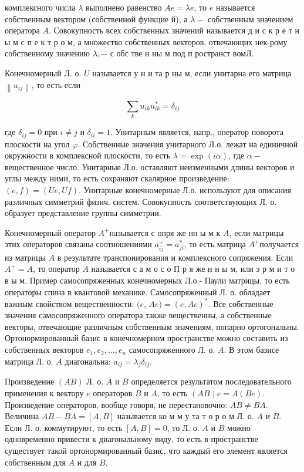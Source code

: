\documentclass[10pt]{article}
\begin{document}
комплексного числа $\lambda$ выполнено равенство $A e=\lambda e$, то $e$ называется собственным вектором (собственной функцие й), а $\lambda-$ собственным значением оператора $A$. Совокупность всех собственных значений называется д и с к р е т н ы м с п е к т р о м, а множество собственных векторов, отвечающих нек-рому собственному значению $\lambda,-$ с обс тве н ны м под п ространст вомЛ.



Конечномерный Л. о. $U$ называется у н и та р ны м, если унитарна его матрица $\left\|u_{i j}\right\|$, то есть если



\[

\sum_{k} u_{i k} u_{i k}^{*}=\delta_{i j}

\]



где $\delta_{i j}=0$ при $i \neq j$ и $\delta_{i i}=1$. Унитарным является, напр., оператор поворота плоскости на угол $\varphi$. Собственные значения унитарного Л.о. лежат на единичной окружности в комплексной плоскости, то есть $\lambda=\exp (i \alpha)$, где $\alpha-$ вещественное число. Унитарные Л.о. оставляют неизменными длины векторов и углы между ними, то есть сохраняют скалярное произведение: $(e, f)=(U e, U f)$. Унитарные конечномерные Л.о. используют для описания различных симметрий физич. систем. Совокупность соответствующих Л. о. образует представление группы симметрии.



Конечномерный оператор $A^{+}$называется с опря же нн ы м к $A$, если матрицы этих операторов связаны соотношениями $a_{i j}^{+}=a_{j i}^{*}$, то есть матрица $A^{+}$получается из матрицы $A$ в результате транспонирования и комплексного сопряжения. Если $A^{+}=A$, то оператор $A$ называется с а м о с о П р я же н н ы м, или э р м и т о в ы м. Пример самосопряженных конечномерных Л.о.- Паули матрицы, то есть операторы спина в квантовой механике. Самосопряженный Л. о. обладает важным свойством вещественности: $(e$, $A e)=(e, A e)^{*}$. Все собственные значения самосопряженного оператора также вещественны, а собственные векторы, отвечающие различным собственным значениям, попарно ортогональны. Ортонормированный базис в конечномерном пространстве можно составить из собственных векторов $e_{1}, e_{2}, \ldots, e_{n}$ самосопряженного Л. о. $A$. В этом базисе матрица Л. о. $A$ диагональна: $a_{i j}=\lambda_{j} \delta_{i j}$.



Произведение $(A B)$ Л. о. $A$ и $B$ определяется результатом последовательного применения к вектору $e$ операторов $B$ и $A$, то есть $(A B) e=A(B e)$. Произведение операторов, вообще говоря, не перестановочно: $A B \neq B A$. Величина $A B-B A=[A, B]$ называется ко м м у та т о р о м Л. о. $A$ и $B$. Если Л. о. коммутируют, то есть $[A, B]=0$, то Л. о. $A$ и $B$ можно одновременно привести к диагональному виду, то есть в пространстве существует такой ортонормированный базис, что каждый его элемент является собственным для $A$ и для $B$.
\end{document}
